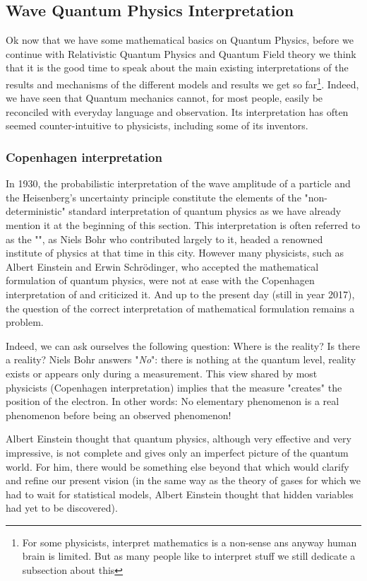 	\pagebreak
	\subsection{Wave Quantum Physics Interpretation}
	Ok now that we have some mathematical basics on Quantum Physics, before we continue with Relativistic Quantum Physics and Quantum Field theory we think that it is the good time to speak about the main existing interpretations of the results and mechanisms of the different models and results we get so far\footnote{For some physicists, interpret mathematics is a non-sense ans anyway human brain is limited. But as many people like to interpret stuff we still dedicate a subsection about this}. Indeed, we have seen that Quantum mechanics cannot, for most people, easily be reconciled with everyday language and observation. Its interpretation has often seemed counter-intuitive to physicists, including some of its inventors.
	
	\subsubsection{Copenhagen interpretation}
	In 1930, the probabilistic interpretation of the wave amplitude of a particle and the Heisenberg's uncertainty principle constitute the elements of the "non-deterministic" standard interpretation of quantum physics as we have already mention it at the beginning of this section. This interpretation is often referred to as the "", as Niels Bohr who contributed largely to it, headed a renowned institute of physics at that time in this city. However many physicists, such as Albert Einstein and Erwin Schrödinger, who accepted the mathematical formulation of quantum physics, were not at ease with the Copenhagen interpretation of and criticized it. And up to the present day (still in year 2017), the question of the correct interpretation of mathematical formulation remains a problem.
	
	Indeed, we can ask ourselves the following question: Where is the reality? Is there a reality? Niels Bohr answers "\textit{No}": there is nothing at the quantum level, reality exists or appears only during a measurement. This view shared by most physicists (Copenhagen interpretation) implies that the measure "creates" the position of the electron. In other words: No elementary phenomenon is a real phenomenon before being an observed phenomenon!
	
	Albert Einstein thought that quantum physics, although very effective and very impressive, is not complete and gives only an imperfect picture of the quantum world. For him, there would be something else beyond that which would clarify and refine our present vision (in the same way as the theory of gases for which we had to wait for statistical models, Albert Einstein thought that hidden variables had yet to be discovered).
	
